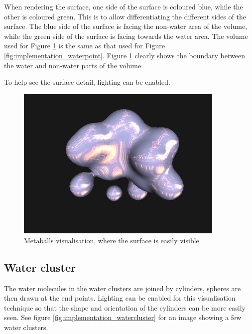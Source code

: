 When rendering the surface, one side of the surface is coloured blue, while the
other is coloured green. This is to allow differentiating the different sides
of the surface. The blue side of the surface is facing the non-water area of
the volume, while the green side of the surface is facing towards the water
area. The volume used for Figure \ref{fig:implementation_metaballs} is the same
as that used for Figure \ref{fig:implementation_waterpoint}. Figure
\ref{fig:implementation_metaballs} clearly shows the boundary between the water
and non-water parts of the volume.

To help see the surface detail, lighting can be enabled.

\begin{figure}[h!]
  \begin{center}
    \includegraphics[width=100mm]{metaballs}
  \end{center}
  \caption{Metaballs visualisation, where the surface is easily visible}
  \label{fig:implementation_metaballs}
\end{figure}


\subsection{Water cluster}
\label{sub:implementation_cluster}

The water molecules in the water clusters are joined by cylinders, spheres are
then drawn at the end points. Lighting can be enabled for this visualisation
technique so that the shape and orientation of the cylinders can be more easily
seen. See figure \ref{fig:implementation_watercluster} for an image showing a
few water clusters.

